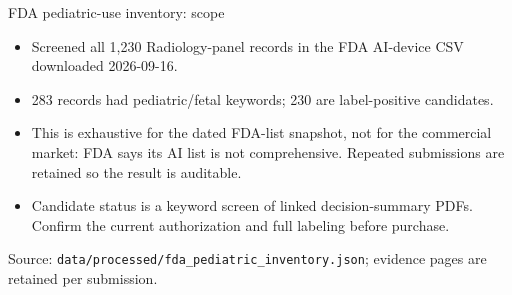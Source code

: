 \documentclass[aspectratio=169]{beamer}
\begin{document}
\begin{frame}[category=FDA appendix]{FDA pediatric-use inventory: scope}
\scriptsize\begin{itemize}
\item Screened all 1,230 Radiology-panel records in the FDA AI-device CSV downloaded 2026-09-16.
\item 283 records had pediatric/fetal keywords; 230 are label-positive candidates.
\item This is exhaustive for the dated FDA-list snapshot, not for the commercial market: FDA says its AI list is not comprehensive. Repeated submissions are retained so the result is auditable.
\item Candidate status is a keyword screen of linked decision-summary PDFs. Confirm the current authorization and full labeling before purchase.
\end{itemize}
\vspace{5pt}\tiny Source: \texttt{data/processed/fda\_pediatric\_inventory.json}; evidence pages are retained per submission.
\end{frame}
\end{document}
